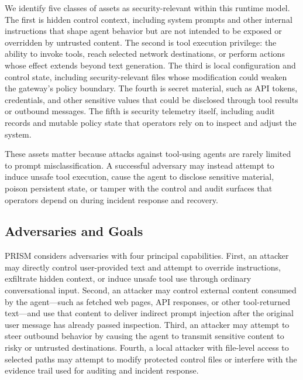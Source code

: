 We identify five classes of assets as security-relevant within this runtime model. The first is hidden control context, including system prompts and other internal instructions that shape agent behavior but are not intended to be exposed or overridden by untrusted content. The second is tool execution privilege: the ability to invoke tools, reach selected network destinations, or perform actions whose effect extends beyond text generation. The third is local configuration and control state, including security-relevant files whose modification could weaken the gateway's policy boundary. The fourth is secret material, such as API tokens, credentials, and other sensitive values that could be disclosed through tool results or outbound messages. The fifth is security telemetry itself, including audit records and mutable policy state that operators rely on to inspect and adjust the system.

These assets matter because attacks against tool-using agents are rarely limited to prompt misclassification. A successful adversary may instead attempt to induce unsafe tool execution, cause the agent to disclose sensitive material, poison persistent state, or tamper with the control and audit surfaces that operators depend on during incident response and recovery.

\subsection{Adversaries and Goals}

PRISM considers adversaries with four principal capabilities. First, an attacker may directly control user-provided text and attempt to override instructions, exfiltrate hidden context, or induce unsafe tool use through ordinary conversational input. Second, an attacker may control external content consumed by the agent---such as fetched web pages, API responses, or other tool-returned text---and use that content to deliver indirect prompt injection after the original user message has already passed inspection. Third, an attacker may attempt to steer outbound behavior by causing the agent to transmit sensitive content to risky or untrusted destinations. Fourth, a local attacker with file-level access to selected paths may attempt to modify protected control files or interfere with the evidence trail used for auditing and incident response.

